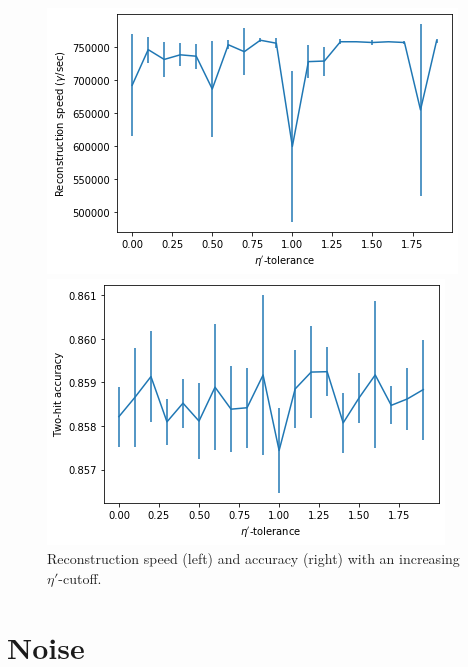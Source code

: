 \begin{figure}
    \centering
    \begin{minipage}{0.49\textwidth} \centering
        \includegraphics[width=\textwidth]{graphs/pi_eta_speed.png}
        \end{minipage}
        \begin{minipage}{0.49\textwidth} \centering
        \includegraphics[width=\textwidth]{graphs/pi_eta_acc.png}
        \end{minipage}
        \caption{Reconstruction speed (left) and accuracy (right) with an increasing $\eta'$-cutoff.}
        \label{fig:eta}
\end{figure}

\section{Noise}
